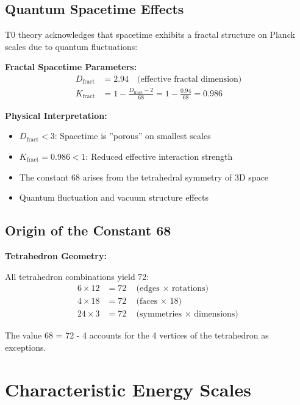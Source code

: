\documentclass[12pt,a4paper]{article}
\begin{document}
	\subsection{Quantum Spacetime Effects}
	
	T0 theory acknowledges that spacetime exhibits a fractal structure on Planck scales due to quantum fluctuations:
	
	\begin{keyresult}
		\textbf{Fractal Spacetime Parameters:}
		\begin{align}
			D_{\text{fract}} &= 2.94 \quad \text{(effective fractal dimension)} \\
			K_{\text{fract}} &= 1 - \frac{D_{\text{fract}} - 2}{68} = 1 - \frac{0.94}{68} = 0.986
		\end{align}
		
		\textbf{Physical Interpretation:}
		\begin{itemize}
			\item $D_{\text{fract}} < 3$: Spacetime is ''porous'' on smallest scales
			\item $K_{\text{fract}} = 0.986 < 1$: Reduced effective interaction strength
			\item The constant 68 arises from the tetrahedral symmetry of 3D space
			\item Quantum fluctuation and vacuum structure effects
		\end{itemize}
	\end{keyresult}
	
	\subsection{Origin of the Constant 68}
	
	\begin{alternative}
		\textbf{Tetrahedron Geometry:}
		
		All tetrahedron combinations yield 72:
		\begin{align}
			6 \times 12 &= 72 \quad \text{(edges $\times$ rotations)} \\
			4 \times 18 &= 72 \quad \text{(faces $\times$ 18)} \\
			24 \times 3 &= 72 \quad \text{(symmetries $\times$ dimensions)}
		\end{align}
		
		The value 68 = 72 - 4 accounts for the 4 vertices of the tetrahedron as exceptions.
	\end{alternative}
	
	\section{Characteristic Energy Scales}
	
\end{document}
